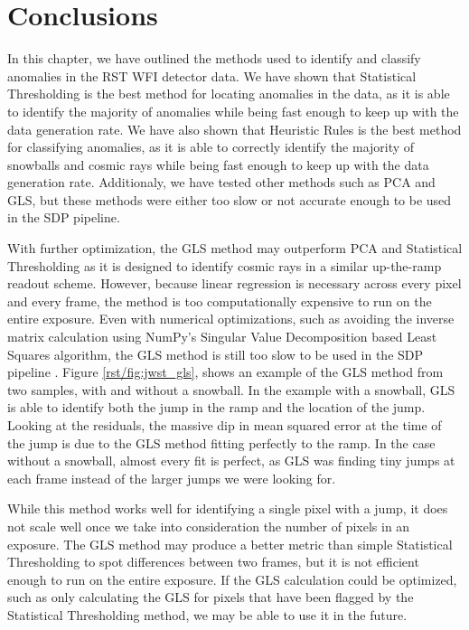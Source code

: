 \section{Conclusions}
\label{rst/sec:conclusions}
In this chapter, we have outlined the methods used to identify and classify anomalies in the RST WFI detector data.
We have shown that Statistical Thresholding is the best method for locating anomalies in the data, as it is able to identify the majority of anomalies while being fast enough to keep up with the data generation rate.
We have also shown that Heuristic Rules is the best method for classifying anomalies, as it is able to correctly identify the majority of snowballs and cosmic rays while being fast enough to keep up with the data generation rate.
Additionaly, we have tested other methods such as PCA and GLS, but these methods were either too slow or not accurate enough to be used in the SDP pipeline.

With further optimization, the GLS method may outperform PCA and Statistical Thresholding as it is designed to identify cosmic rays in a similar up-the-ramp readout scheme.
However, because linear regression is necessary across every pixel and every frame, the method is too computationally expensive to run on the entire exposure.
Even with numerical optimizations, such as avoiding the inverse matrix calculation using NumPy's Singular Value Decomposition based Least Squares algorithm, the GLS method is still too slow to be used in the SDP pipeline \parencite{harris2020array}.
Figure \ref{rst/fig:jwst_gls}, shows an example of the GLS method from two samples, with and without a snowball.
In the example with a snowball, GLS is able to identify both the jump in the ramp and the location of the jump.
Looking at the residuals, the massive dip in mean squared error at the time of the jump is due to the GLS method fitting perfectly to the ramp.
In the case without a snowball, almost every fit is perfect, as GLS was finding tiny jumps at each frame instead of the larger jumps we were looking for.

While this method works well for identifying a single pixel with a jump, it does not scale well once we take into consideration the number of pixels in an exposure.
The GLS method may produce a better metric than simple Statistical Thresholding to spot differences between two frames, but it is not efficient enough to run on the entire exposure.
If the GLS calculation could be optimized, such as only calculating the GLS for pixels that have been flagged by the Statistical Thresholding method, we may be able to use it in the future.

